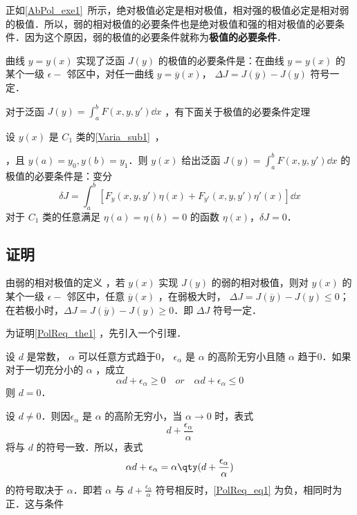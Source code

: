 
正如\autoref{AbPol_exe1}~所示，绝对极值必定是相对极值，相对强的极值必定是相对弱的极值．所以，弱的相对极值的必要条件也是绝对极值和强的相对极值的必要条件．因为这个原因，弱的极值的必要条件就称为\textbf{极值的必要条件}．

曲线 $y=y(x)$ 实现了泛函 $J(y)$ 的极值的必要条件是：在曲线 $y=y(x)$ 的某个一级 $\epsilon-$ 邻区中，对任一曲线 $y=\overline{y}(x)$， $\Delta J=J(\overline{y})-J(y)$ 符号一定．

对于泛函 $J(y)=\int_a^bF(x,y,y')\dd x$ ，有下面关于极值的必要条件定理
\begin{theorem}{}\label{PolReq_the1}
设 $y(x)$ 是 $C_1$ 类的\autoref{Varia_sub1}~，
\end{theorem}，且 $y(a)=y_0,y(b)=y_1$．则 $y(x)$ 给出泛函 $J(y)=\int_a^bF(x,y,y')\dd x$ 的极值的必要条件是：变分
\begin{equation}
\delta J=\int_a^b[F_y(x,y,y')\eta(x)+F_{y'}(x,y,y')\eta'(x)]\dd x
\end{equation}
对于 $C_1$ 类的任意满足 $\eta(a)=\eta(b)=0$ 的函数 $\eta(x)$，$\delta J=0$．
\subsection{证明}
由弱的相对极值的定义 ，若 $y(x)$ 实现 $J(y)$ 的弱的相对极值，则对 $y(x)$ 的某个一级 $\epsilon-$ 邻区中，任意 $\overline{y}(x)$ ，在弱极大时， $\Delta J=J(\overline{y})-J(y)\leq 0$；在若极小时，$\Delta J=J(\overline{y})-J(y)\geq 0$．即 $\Delta J$ 符号一定．

为证明\autoref{PolReq_the1} ，先引入一个引理．
\begin{lemma}{}
设 $d$ 是常数， $\alpha$ 可以任意方式趋于0， $\epsilon_\alpha$ 是 $\alpha$ 的高阶无穷小且随 $\alpha$ 趋于0．如果对于一切充分小的 $\alpha$ ，成立 
\begin{equation}\label{PolReq_eq2}
\alpha d+\epsilon_\alpha\geq0\quad or\quad\alpha d+\epsilon_\alpha\leq0
\end{equation}
则 $d=0$．
\end{lemma}
 设 $d\neq 0$．则因$\epsilon_\alpha$ 是 $\alpha$ 的高阶无穷小，当 $\alpha\rightarrow0$ 时，表式
\begin{equation}
d+\frac{\epsilon_\alpha}{\alpha}
\end{equation}
 将与 $d$ 的符号一致．所以，表式
 \begin{equation}\label{PolReq_eq1}
 \alpha d+\epsilon_\alpha=\alpha\qty(d+\frac{\epsilon_\alpha}{\alpha})
 \end{equation}
 的符号取决于 $\alpha$．即若 $\alpha$ 与 $d+\frac{\epsilon_\alpha}{\alpha}$ 符号相反时，\autoref{PolReq_eq1} 为负，相同时为正．这与条件